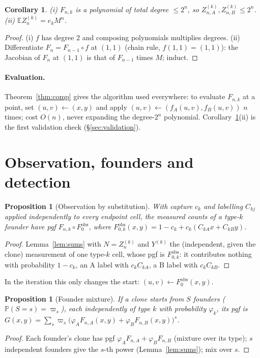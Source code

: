 \documentclass[11pt]{article}
\newtheorem{proposition}[theorem]{Proposition}
\newtheorem{corollary}[theorem]{Corollary}
\theoremstyle{definition}
\theoremstyle{remark}
\newcommand{\E}{\mathbb{E}}
\newcommand{\Prob}{\mathbb{P}}
\begin{document}
\begin{corollary}\label{cor:degree}
(i) $F_{n,k}$ is a polynomial of total degree $\le2^n$, so $Z^{(k)}_{n,A},Z^{(k)}_{n,B}\le2^n$. (ii) $\E Z^{(k)}_n=e_kM^n$.
\end{corollary}
\begin{proof}
(i) $f$ has degree 2 and composing polynomials multiplies degrees. (ii) Differentiate $F_n=F_{n-1}\circ f$ at $(1,1)$ (chain rule, $f(1,1)=(1,1)$): the Jacobian of $F_n$ at $(1,1)$ is that of $F_{n-1}$ times $M$; induct.
\end{proof}

\paragraph{Evaluation.} Theorem~\ref{thm:comp} gives the algorithm used everywhere: to evaluate $F_{n,k}$ at a point, set $(u,v)\leftarrow(x,y)$ and apply $(u,v)\leftarrow(f_A(u,v),f_B(u,v))$ $n$ times; cost $O(n)$, never expanding the degree-$2^n$ polynomial. Corollary~\ref{cor:degree}(ii) is the first validation check (\S\ref{sec:validation}).

\section{Observation, founders and detection}\label{sec:obs}
\begin{proposition}[Observation by substitution]\label{prop:obs}
With capture $c_k$ and labelling $C_{kj}$ applied independently to every endpoint cell, the measured counts of a type-$k$ founder have pgf $F_{n,k}\circ F^{\mathrm{obs}}_0$, where $F^{\mathrm{obs}}_{0,k}(x,y)=1-c_k+c_k(C_{kA}x+C_{kB}y)$.
\end{proposition}
\begin{proof}
Lemma~\ref{lem:sums} with $N=Z^{(k)}_n$ and $Y^{(k)}$ the (independent, given the clone) measurement of one type-$k$ cell, whose pgf is $F^{\mathrm{obs}}_{0,k}$: it contributes nothing with probability $1-c_k$, an A label with $c_kC_{kA}$, a B label with $c_kC_{kB}$.
\end{proof}
\noindent In the iteration this only changes the start: $(u,v)\leftarrow F^{\mathrm{obs}}_0(x,y)$.

\begin{proposition}[Founder mixture]\label{prop:founder}
If a clone starts from $S$ founders ($\Prob(S=s)=\varpi_s$), each independently of type $k$ with probability $\varphi_k$, its pgf is $G(x,y)=\sum_s\varpi_s\big(\varphi_AF_{n,A}(x,y)+\varphi_BF_{n,B}(x,y)\big)^s$.
\end{proposition}
\begin{proof}
Each founder's clone has pgf $\varphi_AF_{n,A}+\varphi_BF_{n,B}$ (mixture over its type); $s$ independent founders give the $s$-th power (Lemma~\ref{lem:sums}); mix over $s$.
\end{proof}
\end{document}
